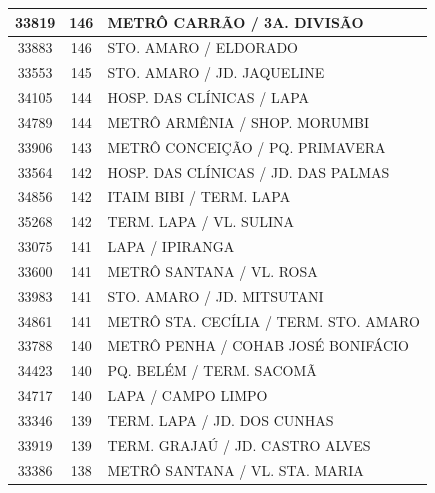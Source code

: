 \documentclass[
	12pt,				%
	oneside,			%
	a4paper,			%
	english,			%
	brazil				%
	]{abntex2ppgsi}
\begin{document}
\begin{apendicesenv}
\begin{longtable}{c|c|p{7cm}}
    33819 & 146   & METRÔ CARRÃO / 3A. DIVISÃO \\
\hline

    33883 & 146   & STO. AMARO / ELDORADO \\
\hline

    33553 & 145   & STO. AMARO / JD. JAQUELINE \\
\hline

    34105 & 144   & HOSP. DAS CLÍNICAS / LAPA \\
\hline

    34789 & 144   & METRÔ ARMÊNIA / SHOP. MORUMBI \\
\hline

    33906 & 143   & METRÔ CONCEIÇÃO / PQ. PRIMAVERA \\
\hline

    33564 & 142   & HOSP. DAS CLÍNICAS / JD. DAS PALMAS \\
\hline

    34856 & 142   & ITAIM BIBI / TERM. LAPA \\
\hline

    35268 & 142   & TERM. LAPA / VL. SULINA \\
\hline

    33075 & 141   & LAPA / IPIRANGA \\
\hline

    33600 & 141   & METRÔ SANTANA / VL. ROSA \\
\hline

    33983 & 141   & STO. AMARO / JD. MITSUTANI \\
\hline

    34861 & 141   & METRÔ STA. CECÍLIA / TERM. STO. AMARO \\
\hline

    33788 & 140   & METRÔ PENHA / COHAB JOSÉ BONIFÁCIO \\
\hline

    34423 & 140   & PQ. BELÉM / TERM. SACOMÃ \\
\hline

    34717 & 140   & LAPA / CAMPO LIMPO \\
\hline

    33346 & 139   & TERM. LAPA / JD. DOS CUNHAS \\
\hline

    33919 & 139   & TERM. GRAJAÚ / JD. CASTRO ALVES \\
\hline

    33386 & 138   & METRÔ SANTANA / VL. STA. MARIA \\
\hline


\end{longtable}
\end{apendicesenv}
\end{document}
